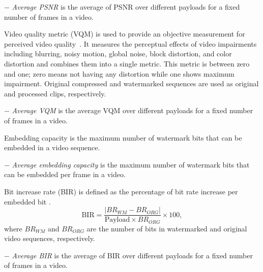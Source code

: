 \noindent$-$ \textit{Average PSNR} is the average of PSNR over different payloads for a fixed number of frames in a video.\\


\noindent Video quality metric (VQM) is used to provide an objective measurement for perceived video quality~\cite{vqm}. It measures the perceptual effects of video impairments including blurring, noisy motion, global noise, block distortion, and color distortion and combines them into a single metric. This metric is between zero and one; zero means not having any distortion while one shows maximum impairment. Original compressed and watermarked sequences are used as original and processed clips, respectively.

\noindent$-$ \textit{Average VQM} is the average VQM over different payloads  for a fixed number of frames in a video.\\



\noindent Embedding capacity is the maximum number of watermark bits that can be embedded in a video sequence. 

\noindent$-$ \textit{Average embedding capacity} is the maximum number of watermark bits that can be embedded per frame in a video. \\


\noindent Bit increase rate (BIR) is defined as the percentage of bit rate increase per embedded bit \cite{masouri2010}.
\begin{equation}
\text{BIR} = \frac{|BR_{WM}-BR_{ORG}|}{\text{Payload} \times BR_{ORG}}  \times 100, \nonumber
\label{chap2_bir}
\end{equation}
where $BR_{WM}$ and $BR_{ORG}$ are the number of bits in watermarked and original video sequences, respectively.

\noindent$-$ \textit{Average BIR} is the average of BIR over different payloads  for a fixed number of frames in a video.\\


